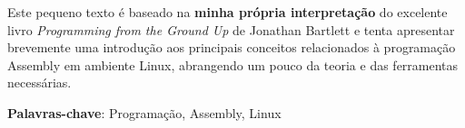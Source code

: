 

\begin{resumo}
Este pequeno texto é baseado na \textbf{minha própria interpretação} do excelente livro \emph{Programming from the Ground Up} de Jonathan Bartlett e tenta apresentar brevemente uma introdução aos principais conceitos relacionados à programação Assembly em ambiente Linux, abrangendo um pouco da teoria e das ferramentas necessárias.

\textbf{Palavras-chave}: Programação, Assembly, Linux
\end{resumo}